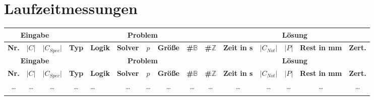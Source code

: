 \section{Laufzeitmessungen}
\label{appendix:results}
\begin{landscape}
    \begin{longtable}{|c|c|c|c|l|c|c|c|c|c|c|c|c|c|c|}
            \hline
            \multicolumn{3}{|c|}{\textbf{Eingabe}} & \multicolumn{7}{c|}{\textbf{Problem}} & \multicolumn{5}{c|}{\textbf{Lösung}} \\
            \hline
            \textbf{Nr.} & \textbf{$\lvert C \rvert$} & \textbf{$\lvert C_{Spec} \rvert$} & \textbf{Typ} & \textbf{Logik} & \textbf{Solver} & \textbf{$p$} & \textbf{Größe} & \textbf{\#$\mathbb{B}$} & \textbf{\#$\mathbb{Z}$} & \textbf{Zeit in s} & \textbf{$\lvert C_{Not} \rvert$} & \textbf{$\lvert P \rvert$} & \textbf{Rest in mm} & \textbf{Zert.} \\
            \hline
            \endfirsthead

            \hline
            \multicolumn{3}{|c|}{\textbf{Eingabe}} & \multicolumn{7}{c|}{\textbf{Problem}} & \multicolumn{5}{c|}{\textbf{Lösung}} \\
            \hline
            \textbf{Nr.} & \textbf{$\lvert C \rvert$} & \textbf{$\lvert C_{Spec} \rvert$} & \textbf{Typ} & \textbf{Logik} & \textbf{Solver} & \textbf{$p$} & \textbf{Größe} & \textbf{\#$\mathbb{B}$} & \textbf{\#$\mathbb{Z}$} & \textbf{Zeit in s} & \textbf{$\lvert C_{Not} \rvert$} & \textbf{$\lvert P \rvert$} & \textbf{Rest in mm} & \textbf{Zert.} \\
            \hline
            \endhead

            \ldots & \ldots & \ldots & \ldots & \ldots & \ldots & \ldots & \ldots & \ldots & \ldots & \ldots & \ldots & \ldots & \ldots & \ldots \\
            \endfoot

            \endlastfoot


\end{longtable}
\end{landscape}
